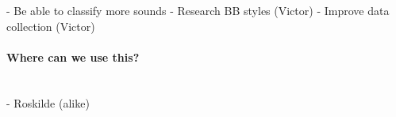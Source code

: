 	- Be able to classify more sounds
		- Research BB styles (Victor)
	- Improve data collection (Victor)


\paragraph{Where can we use this?} \hspace{0pt} \\


	- Roskilde (alike)